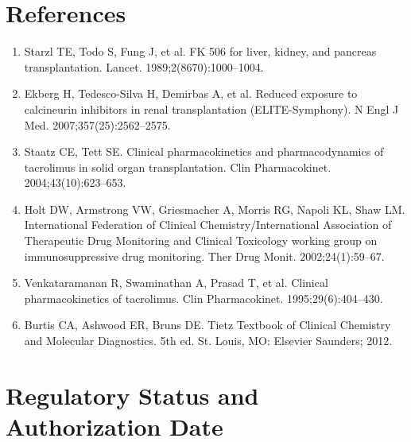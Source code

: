 \section*{References}
\begin{enumerate}
  \item Starzl TE, Todo S, Fung J, et al. FK 506 for liver, kidney, and pancreas transplantation. Lancet. 1989;2(8670):1000--1004.
  \item Ekberg H, Tedesco-Silva H, Demirbas A, et al. Reduced exposure to calcineurin inhibitors in renal transplantation (ELITE-Symphony). N Engl J Med. 2007;357(25):2562--2575.
  \item Staatz CE, Tett SE. Clinical pharmacokinetics and pharmacodynamics of tacrolimus in solid organ transplantation. Clin Pharmacokinet. 2004;43(10):623--653.
  \item Holt DW, Armstrong VW, Griesmacher A, Morris RG, Napoli KL, Shaw LM. International Federation of Clinical Chemistry/International Association of Therapeutic Drug Monitoring and Clinical Toxicology working group on immunosuppressive drug monitoring. Ther Drug Monit. 2002;24(1):59--67.
  \item Venkataramanan R, Swaminathan A, Prasad T, et al. Clinical pharmacokinetics of tacrolimus. Clin Pharmacokinet. 1995;29(6):404--430.
  \item Burtis CA, Ashwood ER, Bruns DE. Tietz Textbook of Clinical Chemistry and Molecular Diagnostics. 5th ed. St. Louis, MO: Elsevier Saunders; 2012.
\end{enumerate}

\clearpage
\section*{Regulatory Status and Authorization Date}

\clearpage
